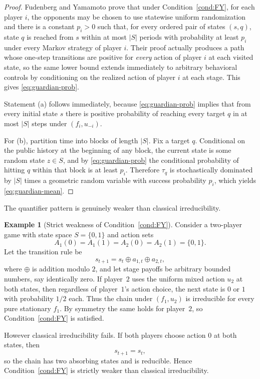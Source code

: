 \documentclass[11pt]{article}
\theoremstyle{definition}
\newtheorem{example}[theorem]{Example}
\newcommand{\1}{\mathbf{1}}
\begin{document}
\begin{proof}
Fudenberg and Yamamoto \cite[Lemma~1]{FudenbergYamamoto2011} prove that under Condition~\ref{cond:FY}, for each player $i$, the opponents may be chosen to use statewise uniform randomization and there is a constant $p_i>0$ such that, for every ordered pair of states $(s,q)$, state $q$ is reached from $s$ within at most $|S|$ periods with probability at least $p_i$ under every Markov strategy of player $i$. Their proof actually produces a path whose one-step transitions are positive for \emph{every} action of player $i$ at each visited state, so the same lower bound extends immediately to arbitrary behavioral controls by conditioning on the realized action of player $i$ at each stage. This gives \eqref{eq:guardian-prob}.

Statement \textup{(a)} follows immediately, because \eqref{eq:guardian-prob} implies that from every initial state $s$ there is positive probability of reaching every target $q$ in at most $|S|$ steps under $(f_i,u_{-i})$.

For \textup{(b)}, partition time into blocks of length $|S|$. Fix a target $q$. Conditional on the public history at the beginning of any block, the current state is some random state $z\in S$, and by \eqref{eq:guardian-prob} the conditional probability of hitting $q$ within that block is at least $p_i$. Therefore $\tau_q$ is stochastically dominated by $|S|$ times a geometric random variable with success probability $p_i$, which yields \eqref{eq:guardian-mean}.
\end{proof}

The quantifier pattern is genuinely weaker than classical irreducibility.

\begin{example}[Strict weakness of Condition~\ref{cond:FY}]\label{ex:strictly-weaker}
Consider a two-player game with state space $S=\{0,1\}$ and action sets
\[
A_1(0)=A_1(1)=A_2(0)=A_2(1)=\{0,1\}.
\]
Let the transition rule be
\[
s_{t+1}=s_t\oplus a_{1,t}\oplus a_{2,t},
\]
where $\oplus$ is addition modulo $2$, and let stage payoffs be arbitrary bounded numbers, say identically zero. If player~$2$ uses the uniform mixed action $u_2$ at both states, then regardless of player~$1$'s action choice, the next state is $0$ or $1$ with probability $1/2$ each. Thus the chain under $(f_1,u_2)$ is irreducible for every pure stationary $f_1$. By symmetry the same holds for player~$2$, so Condition~\ref{cond:FY} is satisfied.

However classical irreducibility fails. If both players choose action $0$ at both states, then
\[
s_{t+1}=s_t,
\]
so the chain has two absorbing states and is reducible. Hence Condition~\ref{cond:FY} is strictly weaker than classical irreducibility.
\end{example}
\end{document}
